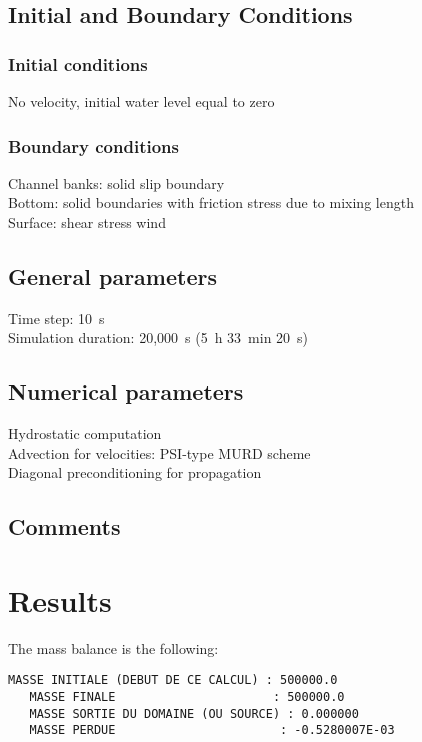 \subsection{Initial and Boundary Conditions}
%
\subsubsection{Initial conditions}
%
No velocity, initial water level equal to zero
%
\subsubsection{Boundary conditions}
%
Channel banks: solid slip boundary\\
Bottom: solid boundaries with friction stress due to mixing length\\
Surface: shear stress wind
%
\subsection{General parameters}
%
Time step: 10~s\\
Simulation duration: 20,000~s (5~h 33~min 20~s)
%
%
%
\subsection{Numerical parameters}
%
Hydrostatic computation\\
Advection for velocities: PSI-type MURD scheme\\
Diagonal preconditioning for propagation
%
\subsection{Comments}
%
%
%
\section{Results}
%
The mass balance is the following:

\begin{lstlisting}[language=TelFortran]
   MASSE INITIALE (DEBUT DE CE CALCUL) : 500000.0
   MASSE FINALE                      : 500000.0
   MASSE SORTIE DU DOMAINE (OU SOURCE) : 0.000000
   MASSE PERDUE                       : -0.5280007E-03
\end{lstlisting}

